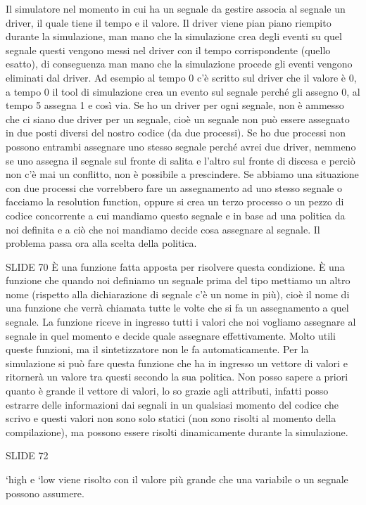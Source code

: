 \documentclass[10pt,a4paper,titlepage]{article}
\begin{document}
Il simulatore nel momento in cui ha un segnale da gestire associa al segnale un driver, il quale tiene il tempo e il valore. Il driver viene pian piano riempito durante la simulazione, man mano che la simulazione crea degli eventi su quel segnale questi vengono messi nel driver con il tempo corrispondente (quello esatto), di conseguenza man mano che la simulazione procede gli eventi vengono eliminati dal driver.
Ad esempio al tempo 0 c’è scritto sul driver che il valore è 0, a tempo 0 il tool di simulazione crea un evento sul segnale perché gli assegno 0, al tempo 5 assegna 1 e così via. Se ho un driver per ogni segnale, non è ammesso che ci siano due driver per un segnale, cioè un segnale non può essere assegnato in due posti diversi del nostro codice (da due processi). Se ho due processi non possono entrambi assegnare uno stesso segnale perché avrei due driver, nemmeno se uno assegna il segnale sul fronte di salita e l’altro sul fronte di discesa e perciò non c’è mai un conflitto, non è possibile a prescindere. Se abbiamo una situazione con due processi che vorrebbero fare un assegnamento ad uno stesso segnale o facciamo la resolution function, oppure si crea un terzo processo o un pezzo di codice concorrente a cui mandiamo questo segnale e in base ad una politica da noi definita e a ciò che noi mandiamo decide cosa assegnare al segnale. Il problema passa ora alla scelta della politica.

SLIDE 70
È una funzione fatta apposta per risolvere questa condizione. È una funzione che quando noi definiamo un segnale prima del tipo mettiamo un altro nome (rispetto alla dichiarazione di segnale c’è un nome in più), cioè il nome di una funzione che verrà chiamata tutte le volte che si fa un assegnamento a quel segnale. La funzione riceve in ingresso tutti i valori che noi vogliamo assegnare al segnale in quel momento e decide quale assegnare effettivamente. Molto utili queste funzioni, ma il sintetizzatore non le fa automaticamente. Per la simulazione si può fare questa funzione che ha in ingresso un vettore di valori e ritornerà un valore tra questi secondo la sua politica. Non posso sapere a priori quanto è grande il vettore di valori, lo so grazie agli attributi, infatti posso estrarre delle informazioni dai segnali in un qualsiasi momento del codice che scrivo e questi valori non sono solo statici (non sono risolti al momento della compilazione), ma possono essere risolti dinamicamente durante la simulazione.

SLIDE 72

‘high e ‘low viene risolto con il valore più grande che una variabile o un segnale possono assumere.
\end{document}
